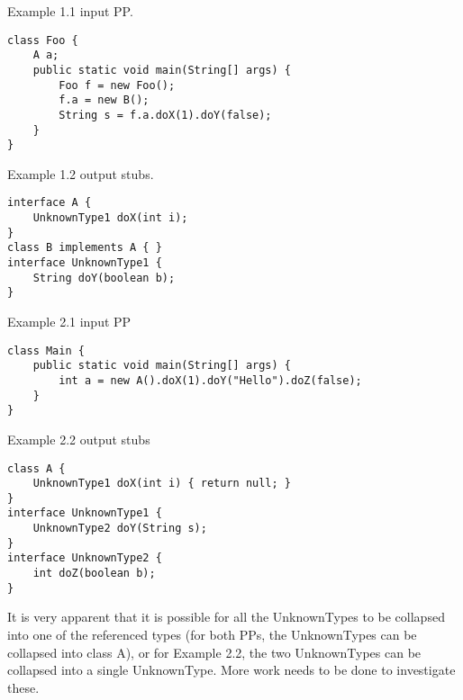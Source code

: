 \documentclass{article}
\begin{document}
Example 1.1 input PP.

\begin{verbatim}
class Foo {
    A a;
    public static void main(String[] args) {
        Foo f = new Foo();
        f.a = new B();
        String s = f.a.doX(1).doY(false);
    }
}
\end{verbatim}

Example 1.2 output stubs.

\begin{verbatim}
interface A {
    UnknownType1 doX(int i);
}
class B implements A { }
interface UnknownType1 {
    String doY(boolean b);
}
\end{verbatim}

Example 2.1 input PP

\begin{verbatim}
class Main {
    public static void main(String[] args) {
        int a = new A().doX(1).doY("Hello").doZ(false);
    }
}
\end{verbatim}


Example 2.2 output stubs

\begin{verbatim}
class A {
    UnknownType1 doX(int i) { return null; }
}
interface UnknownType1 {
    UnknownType2 doY(String s);
}
interface UnknownType2 {
    int doZ(boolean b);
}
\end{verbatim}

It is very apparent that it is possible for all the UnknownTypes to be
collapsed into one of the referenced types (for both PPs, the UnknownTypes
can be collapsed into class A), or for Example 2.2, the two UnknownTypes can
be collapsed into a single UnknownType. More work needs to be done to investigate
these.


\end{document}
